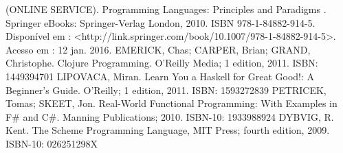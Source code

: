{(ONLINE SERVICE). Programming Languages: Principles and Paradigms . Springer
eBooks: Springer-Verlag London, 2010. ISBN 978-1-84882-914-5. Disponível em : <http://link.springer.com/book/10.1007/978-1-84882-914-5>. Acesso em :
12 jan. 2016.
\newline \newline 
EMERICK, Chas; CARPER, Brian; GRAND, Christophe. Clojure Programming.
O'Reilly Media; 1 edition, 2011. ISBN: 1449394701
\newline \newline 
LIPOVACA, Miran. Learn You a Haskell for Great Good!: A Beginner's Guide.
O'Reilly; 1 edition, 2011. ISBN: 1593272839
\newline \newline 
PETRICEK, Tomas; SKEET, Jon. Real-World Functional Programming: With
Examples in F\# and C\#. Manning Publications; 2010. ISBN-10: 1933988924
\newline \newline 
DYBVIG, R. Kent. The Scheme Programming Language, MIT Press; fourth
edition, 2009. ISBN-10: 026251298X
}


